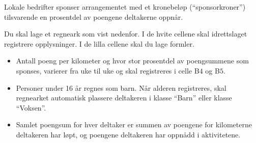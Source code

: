 Lokale bedrifter sponser arrangementet med et kronebeløp
(\enquote{sponsorkroner}) tilsvarende en prosentdel av poengene deltakerne
oppnår. \bigskip

Du skal lage et regneark som vist nedenfor. I de hvite cellene skal idrettslaget
registrere opplysninger. I de lilla cellene skal du lage formler. \bigskip

\begin{itemize}
  \item Antall poeng per kilometer og hvor stor prosentdel av poengsummene som
    sponses, varierer fra uke til uke og skal registreres i celle B$4$ og B$5$.
  \item Personer under 16 år regnes som barn. Når alderen registreres, skal
    regnearket automatisk plassere deltakeren i klasse \enquote{Barn} eller
    klasse \enquote{Voksen}.
  \item Samlet poengsum for hver deltaker er summen av poengene for kilometerne
    deltakeren har løpt, og poengene deltakeren har oppnådd i aktivitetene.
\end{itemize}







